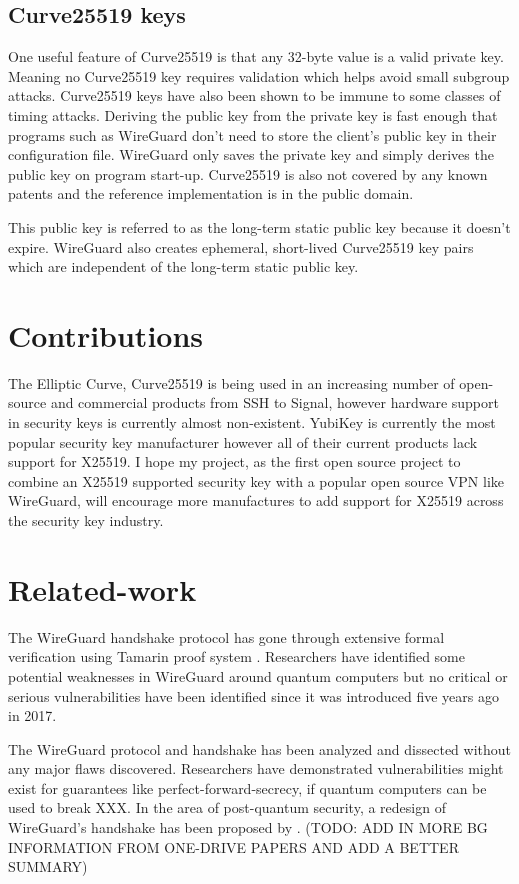 \documentclass [11pt, proquest] {uwthesis}[2020/02/24]
\begin{document}
\subsection{Curve25519 keys}
One useful feature of Curve25519 is that any 32-byte value is a valid private key. Meaning no Curve25519 key requires validation which helps avoid small subgroup attacks. Curve25519 keys have also been shown to be immune to some classes of timing attacks\cite{noauthor_safecurves_2022}\cite{sasdrich_implementing_2015}.  Deriving the public key from the private key is fast enough that programs such as WireGuard don't need to store the client's public key in their configuration file. WireGuard only saves the private key and simply derives the public key on program start-up. Curve25519 is also not covered by any known patents and the reference implementation is in the public domain.

This public key is referred to as the long-term static public key because it doesn't expire. WireGuard also creates ephemeral, short-lived Curve25519 key pairs which are independent of the long-term static public key.

\section {Contributions}
The Elliptic Curve, Curve25519 is being used in an increasing number of open-source and commercial products\cite{noauthor_things_nodate-1} from SSH to Signal, however hardware support in 
security keys is currently almost non-existent. YubiKey is currently the most popular security key manufacturer however all of their current products 
lack support for X25519. I hope my project, as the first open source project to combine an X25519 supported security key with a popular open source VPN like WireGuard, will encourage more manufactures to add support for X25519 across the security key industry.

\section {Related-work}
The WireGuard handshake protocol has gone through extensive formal verification using Tamarin proof system \cite{donenfeld_formal_2018}. Researchers have identified some potential weaknesses in WireGuard around quantum computers but no critical or serious vulnerabilities have been identified since it was introduced five years ago in 2017.

The WireGuard protocol and handshake has been analyzed and dissected without any major flaws discovered. Researchers have demonstrated vulnerabilities might exist for guarantees like perfect-forward-secrecy, if quantum computers can be used to break XXX.  In the area of post-quantum security, a redesign of WireGuard's handshake has been proposed by \cite{hulsing_post-quantum_2021}.
(TODO: ADD IN MORE BG INFORMATION FROM ONE-DRIVE PAPERS AND ADD A BETTER SUMMARY)
\end{document}
